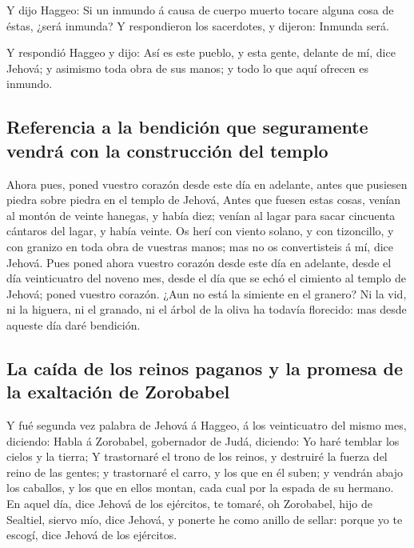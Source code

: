  Y dijo Haggeo: Si un inmundo á causa de cuerpo muerto
tocare alguna cosa de éstas, ¿será inmunda? Y respondieron los
sacerdotes, y dijeron: Inmunda será.

 Y respondió Haggeo y dijo: Así es este pueblo, y esta
gente, delante de mí, dice Jehová; y asimismo toda obra de sus manos; y
todo lo que aquí ofrecen es inmundo.

\hypertarget{referencia-a-la-bendiciuxf3n-que-seguramente-vendruxe1-con-la-construcciuxf3n-del-templo}{%
\subsection{Referencia a la bendición que seguramente vendrá con la
construcción del
templo}\label{referencia-a-la-bendiciuxf3n-que-seguramente-vendruxe1-con-la-construcciuxf3n-del-templo}}

 Ahora pues, poned vuestro corazón desde este día en
adelante, antes que pusiesen piedra sobre piedra en el templo de Jehová,
 Antes que fuesen estas cosas, venían al montón de veinte
hanegas, y había diez; venían al lagar para sacar cincuenta cántaros del
lagar, y había veinte.  Os herí con viento solano, y con
tizoncillo, y con granizo en toda obra de vuestras manos; mas no os
convertisteis á mí, dice Jehová.  Pues poned ahora
vuestro corazón desde este día en adelante, desde el día veinticuatro
del noveno mes, desde el día que se echó el cimiento al templo de
Jehová; poned vuestro corazón.  ¿Aun no está la simiente
en el granero? Ni la vid, ni la higuera, ni el granado, ni el árbol de
la oliva ha todavía florecido: mas desde aqueste día daré bendición.

\hypertarget{la-cauxedda-de-los-reinos-paganos-y-la-promesa-de-la-exaltaciuxf3n-de-zorobabel}{%
\subsection{La caída de los reinos paganos y la promesa de la exaltación
de
Zorobabel}\label{la-cauxedda-de-los-reinos-paganos-y-la-promesa-de-la-exaltaciuxf3n-de-zorobabel}}

 Y fué segunda vez palabra de Jehová á Haggeo, á los
veinticuatro del mismo mes, diciendo:  Habla á Zorobabel,
gobernador de Judá, diciendo: Yo haré temblar los cielos y la tierra;
 Y trastornaré el trono de los reinos, y destruiré la
fuerza del reino de las gentes; y trastornaré el carro, y los que en él
suben; y vendrán abajo los caballos, y los que en ellos montan, cada
cual por la espada de su hermano.  En aquel día, dice
Jehová de los ejércitos, te tomaré, oh Zorobabel, hijo de Sealtiel,
siervo mío, dice Jehová, y ponerte he como anillo de sellar: porque yo
te escogí, dice Jehová de los ejércitos.

